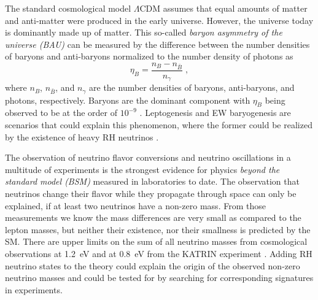 The standard cosmological model $\Lambda$CDM  assumes that equal amounts of matter and anti-matter were produced in the early universe. However, the universe today is dominantly made up of matter. This so-called \textit{baryon asymmetry of the universe (BAU)} can be measured by the difference between the number densities of baryons and anti-baryons normalized to the number density of photons as
\begin{equation}
    \eta_B = \frac{n_B - n_{\bar{B}}}{n_\gamma}
    \;,
\end{equation}
where $n_B$, $n_{\bar{B}}$, and $n_\gamma$ are the number densities of baryons, anti-baryons, and photons, respectively. Baryons are the dominant component with  $\eta_B$ being observed to be at the order of $10^{-9}$ . Leptogenesis and EW baryogenesis are scenarios that could explain this phenomenon, where the former could be realized by the existence of heavy RH neutrinos .

The observation of neutrino flavor conversions and neutrino oscillations in a multitude of experiments  is the strongest evidence for physics \textit{beyond the standard model (BSM)} measured in laboratories to date. The observation that neutrinos change their flavor while they propagate through space can only be explained, if at least two neutrinos have a non-zero mass. From those measurements we know the mass differences are very small as compared to the lepton masses, but neither their existence, nor their smallness is predicted by the SM. There are upper limits on the sum of all neutrino masses from cosmological observations at \SI{1.2}{\electronvolt}  and at \SI{0.8}{\electronvolt} from the KATRIN experiment . Adding RH neutrino states to the theory could explain the origin of the observed non-zero neutrino masses and could be tested for by searching for corresponding signatures in experiments.




